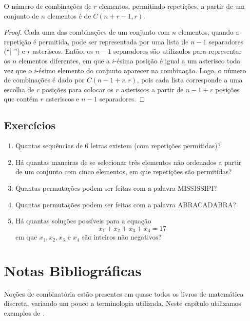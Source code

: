 \begin{Theorem}
O número de combinações de $r$ elementos, permitindo repetições, a
partir de um conjunto de $n$ elementos é de $C(n + r - 1, r)$.
\end{Theorem}
\begin{proof}
Cada uma das combinações de um conjunto com $n$ elementos, quando a
repetição é permitida, pode ser representada por uma lista de $n -1$
separadores (``| '') e $r$ asteriscos. Então, os $n - 1$ separadores
são utilizados para representar os $n$ elementos diferentes, em que a
$i$-ésima posição é igual a um asterisco toda vez que o $i$-ésimo
elemento do conjunto aparecer na combinação. Logo, o número de
combinações é dado por $C(n - 1 + r,r)$, pois cada lista corresponde a
uma escolha de $r$ posições para colocar os $r$ asteriscos a partir de
$n - 1 + r$ posições que contém $r$ asteriscos e $n - 1$ separadores.
\end{proof}

\subsection{Exercícios}

\begin{enumerate}
  \item Quantas sequências de 6 letras existem (com repetições permitidas)?
  \item Há quantas maneiras de se selecionar três elementos não
    ordenados a partir de um conjunto com cinco elementos, em que
    repetições são permitidas?
  \item Quantas permutações podem ser feitas com a palavra MISSISSIPI?
  \item Quantas permutações podem ser feitas com a palavra
    ABRACADABRA?
  \item Há quantas soluções possíveis para a equação
   \[x_1 + x_2 + x_3 + x_4 = 17\]
   em que $x_1,x_2,x_3$ e $x_4$ são inteiros não negativos?
\end{enumerate}

\section{Notas Bibliográficas}

Noções de combinatória estão presentes em quase todos os livros de
matemática discreta, variando um pouco a terminologia utilizada. Neste
capítulo utilizamos exemplos de \cite{Rosen02}.